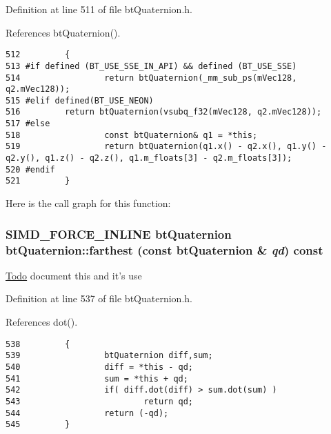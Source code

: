 Definition at line 511 of file btQuaternion.h.

References btQuaternion().

\begin{Code}\begin{verbatim}512         {
513 #if defined (BT_USE_SSE_IN_API) && defined (BT_USE_SSE)
514                 return btQuaternion(_mm_sub_ps(mVec128, q2.mVec128));
515 #elif defined(BT_USE_NEON)
516         return btQuaternion(vsubq_f32(mVec128, q2.mVec128));
517 #else   
518                 const btQuaternion& q1 = *this;
519                 return btQuaternion(q1.x() - q2.x(), q1.y() - q2.y(), q1.z() - q2.z(), q1.m_floats[3] - q2.m_floats[3]);
520 #endif
521         }
\end{verbatim}
\end{Code}




Here is the call graph for this function:\hypertarget{classbt_quaternion_deda27273475435a9e3223abeea73992}{
\subsubsection[farthest]{\setlength{\rightskip}{0pt plus 5cm}SIMD\_\-FORCE\_\-INLINE {\bf btQuaternion} btQuaternion::farthest (const {\bf btQuaternion} \& {\em qd}) const}}
\label{classbt_quaternion_deda27273475435a9e3223abeea73992}


\begin{Desc}
\item[\hyperlink{todo__todo000042}{Todo}]document this and it's use \end{Desc}


Definition at line 537 of file btQuaternion.h.

References dot().

\begin{Code}\begin{verbatim}538         {
539                 btQuaternion diff,sum;
540                 diff = *this - qd;
541                 sum = *this + qd;
542                 if( diff.dot(diff) > sum.dot(sum) )
543                         return qd;
544                 return (-qd);
545         }
\end{verbatim}
\end{Code}




